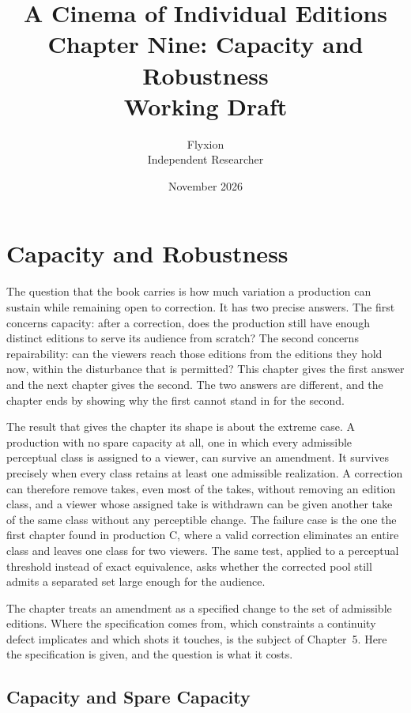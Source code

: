 \documentclass[11pt,twoside,openright]{book}
\title{\Huge\bfseries A Cinema of Individual Editions\\[1.2ex]
\large Chapter Nine: Capacity and Robustness\\[0.4ex]
\large Working Draft}
\author{Flyxion\\[0.3ex]\small Independent Researcher}
\date{November 2026}
\theoremstyle{plain}
\theoremstyle{definition}
\theoremstyle{remark}
\begin{document}
\frontmatter
\maketitle
\tableofcontents
\mainmatter
\setcounter{chapter}{8}

\chapter{Capacity and Robustness}
\label{ch:capacity}

The question that the book carries is how much variation a production can sustain while remaining open to correction. It has two precise answers. The first concerns capacity: after a correction, does the production still have enough distinct editions to serve its audience from scratch? The second concerns repairability: can the viewers reach those editions from the editions they hold now, within the disturbance that is permitted? This chapter gives the first answer and the next chapter gives the second. The two answers are different, and the chapter ends by showing why the first cannot stand in for the second.

The result that gives the chapter its shape is about the extreme case. A production with no spare capacity at all, one in which every admissible perceptual class is assigned to a viewer, can survive an amendment. It survives precisely when every class retains at least one admissible realization. A correction can therefore remove takes, even most of the takes, without removing an edition class, and a viewer whose assigned take is withdrawn can be given another take of the same class without any perceptible change. The failure case is the one the first chapter found in production C, where a valid correction eliminates an entire class and leaves one class for two viewers. The same test, applied to a perceptual threshold instead of exact equivalence, asks whether the corrected pool still admits a separated set large enough for the audience.

The chapter treats an amendment as a specified change to the set of admissible editions. Where the specification comes from, which constraints a continuity defect implicates and which shots it touches, is the subject of Chapter~5. Here the specification is given, and the question is what it costs.

\section{Capacity and Spare Capacity}\label{sec:cap}
\end{document}
